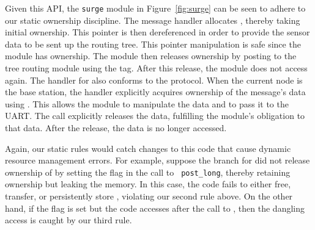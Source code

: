 Given this API, the {\tt surge} module in Figure~\ref{fig:surge} can be seen to
adhere to our static ownership discipline.  
The  message handler allocates ,
thereby taking initial 
ownership. This pointer is then dereferenced in order to provide the
sensor data to be sent up the routing tree.  This pointer manipulation
is safe since the module has ownership.  The module then releases
ownership by posting  to the tree routing module using the
 tag.  After this release, the module does not
access  again. 
The handler for  also conforms to the
protocol.   When the current node is the base station, the handler
explicitly acquires ownership of the message's data using
.  This allows the module to manipulate the data
and to pass it to the UART.  The  call explicitly
releases the data, fulfilling the module's obligation to that data.
After the release, the data is no longer accessed.

Again, our static rules would catch changes to this code that cause
dynamic resource management errors.
For example, suppose the branch for
 did not release ownership of  by
setting the  flag in the call to {\tt
post\_long}, thereby retaining ownership but leaking the memory.    
In this case,
the code fails to either free, transfer, or
persistently store , violating our second rule above.  On
the other hand, if the  flag is set but the
code accesses  after the call to , then the
dangling access is caught by our third rule.
 


